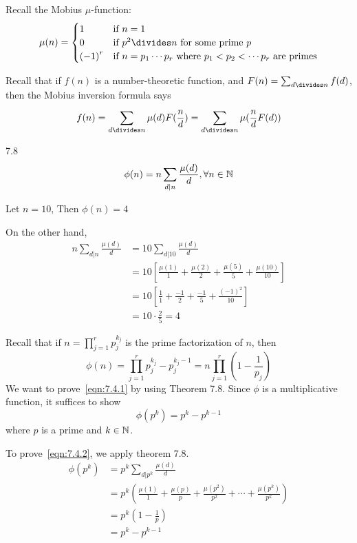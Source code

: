 \begin{note}
    Recall the Mobius $\mu$-function:
    \[
        \mu(n) = \begin{cases}
            1 &\text{if } n = 1\\
            0 &\text{if } p^2 \divides n \text{ for some prime } p\\
            {(-1)}^r &\text{if } n = p_1 \cdots p_r \text{ where } p_1 < p_2 < \cdots p_r \text{ are primes}\\
        \end{cases}
    \]

    Recall that if $f(n)$ is a number-theoretic function, \newline
    and $F(n) = \sum_{d \divides n}^{}{f(d)}$,\newline
    then the Mobius inversion formula says
    \[
        f(n) = \sum_{d \divides n}^{}{\mu(d)F(\frac{n}{d})} = \sum_{d \divides n}^{}{\mu(\frac{n}{d}F(d))}
    \]
\end{note}

\begin{theorem}
    7.8
    \[
        \phi(n) = n \sum_{d|n}{\frac{\mu(d)}{d}}, \forall n \in \mathbb{N}
    \]
\end{theorem}

\begin{eg}
    Let $n = 10$, Then $\phi(n) = 4$

    On the other hand,
    \[
        \begin{aligned}
            n \sum_{d|n}^{}{\frac{\mu(d)}{d}} &= 10 \sum_{d|10}^{}{\frac{\mu(d)}{d}} \\
            &= 10 [\frac{\mu(1)}{1} + \frac{\mu(2)}{2} + \frac{\mu(5)}{5} + \frac{\mu(10)}{10}] \\
            &= 10 [\frac{1}{1} + \frac{-1}{2} + \frac{-1}{5} + \frac{{(-1)}^2}{10}] \\
            &= 10 \cdot \frac{2}{5} = 4
        \end{aligned}
    \]

    Recall that if $n = \prod_{j=1}^{r}{p^{k_j}_{j}}$ is the prime factorization of $n$,
    then 
    \[
        \tag{*}
        \phi(n) = \prod_{j=1}^{r}{p^{k_j}_{j} - p^{k_j-1}_{j}} = n\prod_{j=1}^{r}{(1-\frac{1}{p_j})}
        \label{eqn:7.4.1}
    \]
    We want to prove~\eqref{eqn:7.4.1} by using Theorem 7.8.
    Since $\phi$ is a multiplicative function, it suffices to show 
    \[
        \tag{**}
        \phi(p^k) = p^k - p^{k-1}
        \label{eqn:7.4.2}
    \]
    where $p$ is a prime and $k \in \mathbb{N}$.

    To prove~\eqref{eqn:7.4.2}, we apply theorem 7.8.
    \[
        \begin{aligned}
            \phi(p^k) &= p^k \sum_{d|p^k}{\frac{\mu(d)}{d}} \\
            &= p^k (\frac{\mu(1)}{1} + \frac{\mu(p)}{p} + \frac{\mu(p^2)}{p^2} + \cdots + \frac{\mu(p^k)}{p^k}) \\
            &= p^k (1 - \frac{1}{p}) \\
            &= p^k - p^{k-1}
        \end{aligned}
    \]
\end{eg}


